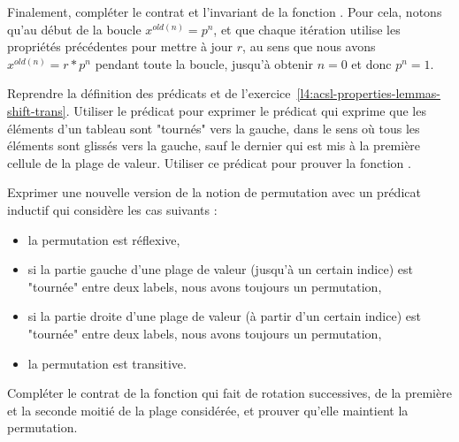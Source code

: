 Finalement, compléter le contrat et l'invariant de la fonction .
Pour cela, notons qu'au début de la boucle $x^{old(n)} = p^n$, et que chaque itération
utilise les propriétés précédentes pour mettre à jour $r$, au sens que nous avons
$x^{old(n)} = r * p^n$ pendant toute la boucle, jusqu'à obtenir $n = 0$ et donc
$p ^n = 1$.






Reprendre la définition des prédicats  et 
de l'exercice~\ref{l4:acsl-properties-lemmas-shift-trans}. Utiliser le prédicat
 pour exprimer le prédicat  qui exprime que
les éléments d'un tableau sont "tournés" vers la gauche, dans le sens où tous les
éléments sont glissés vers la gauche, sauf le dernier qui est mis à la première
cellule de la plage de valeur. Utiliser ce prédicat pour prouver la fonction
.





Exprimer une nouvelle version de la notion de permutation avec un prédicat inductif
qui considère les cas suivants :

\begin{itemize}
\item la permutation est réflexive,
\item si la partie gauche d'une plage de valeur (jusqu'à un certain indice) est
      "tournée" entre deux labels, nous avons toujours un permutation,
\item si la partie droite d'une plage de valeur (à partir d'un certain indice) est
      "tournée" entre deux labels, nous avons toujours un permutation,
\item la permutation est transitive.
\end{itemize}




Compléter le contrat de la fonction  qui fait de rotation
successives, de la première et la seconde moitié de la plage considérée, et prouver
qu'elle maintient la permutation.


